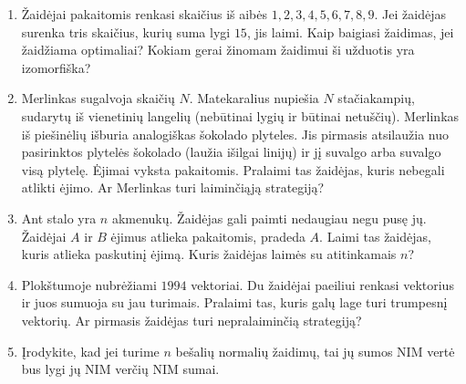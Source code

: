 \begin{enumerate}
  \item Žaidėjai pakaitomis renkasi skaičius iš aibės ${1, 2, 3, 4, 5, 6, 7,
    8, 9}$. Jei žaidėjas surenka tris skaičius, kurių suma lygi $15$, jis
    laimi.  Kaip baigiasi žaidimas, jei žaidžiama optimaliai? Kokiam gerai
    žinomam žaidimui ši užduotis yra izomorfiška?

  \item Merlinkas sugalvoja skaičių $N$. Matekaralius nupiešia $N$
    stačiakampių, sudarytų iš vienetinių langelių (nebūtinai lygių ir būtinai
    netuščių). Merlinkas iš piešinėlių išburia analogiškas šokolado plyteles.
    Jis pirmasis atsilaužia nuo pasirinktos plytelės šokolado (laužia išilgai
    linijų) ir jį suvalgo arba suvalgo visą plytelę. Ėjimai vyksta
    pakaitomis. Pralaimi tas žaidėjas, kuris nebegali atlikti ėjimo.  Ar
    Merlinkas turi laiminčiąją strategiją?  

  \item Ant stalo yra $n$ akmenukų. Žaidėjas gali paimti nedaugiau negu pusę
    jų. Žaidėjai $A$ ir $B$ ėjimus atlieka pakaitomis, pradeda $A$.  Laimi
    tas žaidėjas, kuris atlieka paskutinį ėjimą. Kuris žaidėjas laimės su
    atitinkamais $n$?

  \item Plokštumoje nubrėžiami $1994$ vektoriai. Du žaidėjai paeiliui renkasi
    vektorius ir juos sumuoja su jau turimais. Pralaimi tas, kuris galų lage
    turi trumpesnį vektorių. Ar pirmasis žaidėjas turi nepralaiminčią
    strategiją?

  \item Įrodykite, kad jei turime $n$ bešalių normalių žaidimų, tai jų sumos NIM
    vertė bus lygi jų NIM verčių NIM sumai. %


\end{enumerate}
